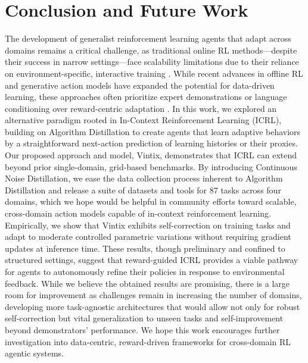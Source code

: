 \documentclass{article}
\theoremstyle{plain}
\theoremstyle{definition}
\theoremstyle{remark}
\begin{document}
\section{Conclusion and Future Work}
The development of generalist reinforcement learning agents that adapt across domains remains a critical challenge, as traditional online RL methods—despite their success in narrow settings—face scalability limitations due to their reliance on environment-specific, interactive training \cite{dulac2019challenges, levine2020offlinereinforcementlearningtutorial}. While recent advances in offline RL and generative action models have expanded the potential for data-driven learning, these approaches often prioritize expert demonstrations or language conditioning over reward-centric adaptation \cite{reed2022generalistagent, gallouédec2024jacktradesmastersome, haldar2024bakuefficienttransformermultitask, embodimentcollaboration2024openxembodimentroboticlearning, schmied2024large, sridhar2024regent}. In this work, we explored an alternative paradigm rooted in In-Context Reinforcement Learning (ICRL), building on Algorithm Distillation \cite{laskin2022incontextreinforcementlearningalgorithm} to create agents that learn adaptive behaviors by a straightforward next-action prediction of learning histories or their proxies.
Our proposed approach and model, Vintix, demonstrates that ICRL can extend beyond prior single-domain, grid-based benchmarks. By introducing Continuous Noise Distillation, we ease the data collection process inherent to Algorithm Distillation and release a suite of datasets and tools for 87 tasks across four domains, which we hope would be helpful in community efforts toward scalable, cross-domain action models capable of in-context reinforcement learning. Empirically, we show that Vintix exhibits self-correction on training tasks and adapt to moderate controlled parametric variations without requiring gradient updates at inference time. These results, though preliminary and confined to structured settings, suggest that reward-guided ICRL provides a viable pathway for agents to autonomously refine their policies in response to environmental feedback.
While we believe the obtained results are promising, there is a large room for improvement as challenges remain in increasing the number of domains, developing more task-agnostic architectures that would allow not only for robust self-correction but vital generalization to unseen tasks and self-improvement beyond demonstrators' performance. We hope this work encourages further investigation into data-centric, reward-driven frameworks for cross-domain RL agentic systems.
\end{document}
